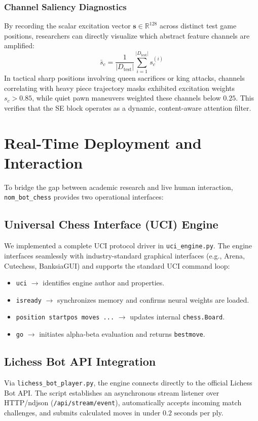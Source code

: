 \documentclass[10pt,journal,compsoc]{IEEEtran}
\begin{document}
\subsubsection{Channel Saliency Diagnostics}
By recording the scalar excitation vector $\mathbf{s} \in \mathbb{R}^{128}$ across distinct test game positions, researchers can directly visualize which abstract feature channels are amplified:
\begin{equation}
\bar{s}_c = \frac{1}{|D_{\text{test}}|} \sum_{i=1}^{|D_{\text{test}}|} s_c^{(i)}
\end{equation}
In tactical sharp positions involving queen sacrifices or king attacks, channels correlating with heavy piece trajectory masks exhibited excitation weights $s_c > 0.85$, while quiet pawn maneuvers weighted these channels below $0.25$. This verifies that the SE block operates as a dynamic, content-aware attention filter.

\section{Real-Time Deployment and Interaction}
\label{sec:deployment}
To bridge the gap between academic research and live human interaction, \texttt{nom\_bot\_chess} provides two operational interfaces:

\subsection{Universal Chess Interface (UCI) Engine}
We implemented a complete UCI protocol driver in \texttt{uci\_engine.py}. The engine interfaces seamlessly with industry-standard graphical interfaces (e.g., Arena, Cutechess, BanksiaGUI) and supports the standard UCI command loop:
\begin{itemize}
    \item \texttt{uci} $\to$ identifies engine author and properties.
    \item \texttt{isready} $\to$ synchronizes memory and confirms neural weights are loaded.
    \item \texttt{position startpos moves ...} $\to$ updates internal \texttt{chess.Board}.
    \item \texttt{go} $\to$ initiates alpha-beta evaluation and returns \texttt{bestmove}.
\end{itemize}

\subsection{Lichess Bot API Integration}
Via \texttt{lichess\_bot\_player.py}, the engine connects directly to the official Lichess Bot API. The script establishes an asynchronous stream listener over HTTP/ndjson (\texttt{/api/stream/event}), automatically accepts incoming match challenges, and submits calculated moves in under $0.2\text{ seconds}$ per ply.
\end{document}
